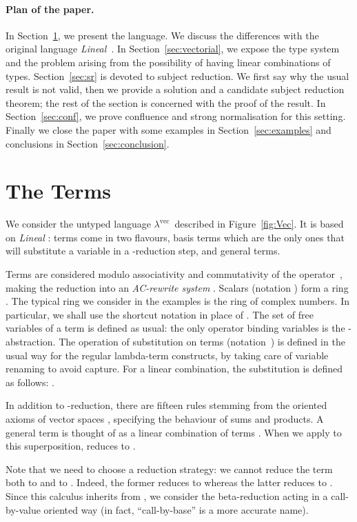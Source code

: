 \documentclass[colorlinks=true,linkcolor=black,urlcolor=black,citecolor=blue,submission,copyright,creativecommons]{eptcs}
\newcommand{\lvec}{\ensuremath{\lambda^{\!\!\textrm{vec}}}}
\begin{document}
\paragraph{Plan of the paper.}
In Section~\ref{sec:language}, we present the language. We discuss the
differences with the original language {\it
  Lineal}~\cite{ArrighiDowekRTA08}. In
Section~\ref{sec:vectorial}, we expose the type system and the problem
arising from the possibility of having linear combinations of types.
Section~\ref{sec:sr} is devoted to subject reduction. We first say
why the usual result is not valid, then we provide a solution and a
candidate subject reduction theorem; the rest of the section is
concerned with the proof of the result.  In Section~\ref{sec:conf}, we prove confluence and strong normalisation for this setting.
Finally we close the paper with some examples in
Section~\ref{sec:examples} and conclusions in
Section~\ref{sec:conclusion}.


\section{The Terms}\label{sec:language}

We consider the untyped language \lvec\ described in
Figure~\ref{fig:Vec}. It is based on {\em Lineal}
\cite{ArrighiDowekRTA08}: terms come in two flavours, basis terms
which are the only ones that will substitute a variable in a
-reduction step, and general terms. 

Terms are considered modulo associativity and commutativity of
the operator~, making the reduction into an {\em AC-rewrite system}
\cite{JouannaudKirchnerSIAM86}.
Scalars (notation ) form a ring
.
The typical ring we consider in the examples is
the ring of complex numbers. In particular, we shall use the shortcut
notation  in place of .
The set of free variables of a term is defined
as usual: the only operator binding variables is the
-abstraction.
The operation of substitution on terms (notation~)
is defined in the usual way for the regular lambda-term constructs, by
taking care of variable renaming to avoid capture. For a linear
combination, the substitution is defined as follows: .

In addition to -reduction, there are fifteen rules stemming from the oriented axioms of vector spaces \cite{ArrighiDowekRTA08}, specifying
the behaviour of sums and products.
A general term  is thought
of as a linear combination of terms . When we apply  to this superposition, 
reduces to .

Note that we need to choose a reduction strategy: we cannot reduce the
term  both to  and to . Indeed, the former reduces to
 whereas the latter reduces to
. Since this calculus inherits from
\cite{ArrighiDiazcaroQPL09,ArrighiDowekRTA08,DiazcaroPetitWoLLIC12}, we
consider the beta-reduction acting in a call-by-value oriented way (in fact, ``call-by-base'' is a more accurate name).
\end{document}
